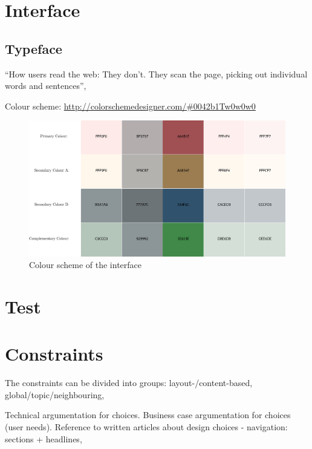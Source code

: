 

\section{Interface}
\subsection{Typeface}
``How users read the web: They don't. They scan the page, picking out individual words and sentences'', %

Colour scheme: \url{http://colorschemedesigner.com/#0042b1Tw0w0w0}

\begin{figure}[h!tp]
	\centering
		\includegraphics[width=.45\textwidth]{img/colour-scheme.eps}
	\caption{Colour scheme of the interface \protect\cite{colorschemedesigner.com}}
	\label{fig:colour-scheme}
\end{figure}

\section{Test}




\section{Constraints}
The constraints can be divided into groups: layout-/content-based, global/topic/neighbouring, 


Technical argumentation for choices.
Business case argumentation for choices (user needs).
Reference to written articles about design choices - navigation: sections + headlines, 

